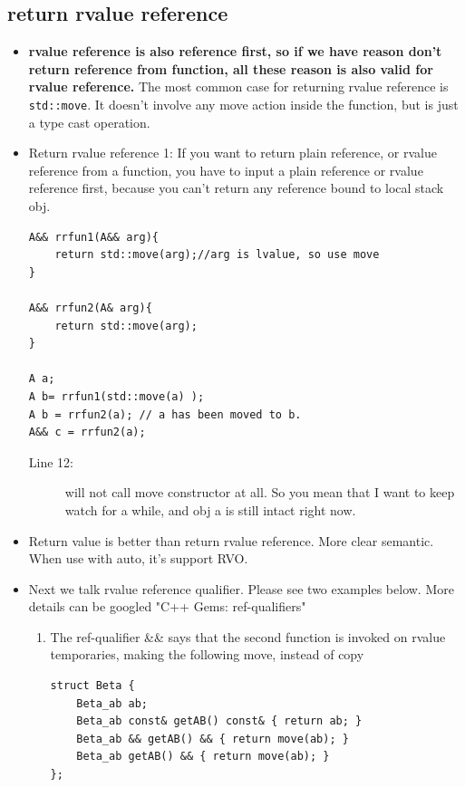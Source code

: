 \documentclass[a4paper,11pt,twoside]{book}
\begin{document}
\subsection{return rvalue reference}
\begin{itemize}
	\item \textbf{rvalue reference is also reference first, so if we have reason don't return reference from function, all these reason is also valid for rvalue reference.} The most common case for returning rvalue reference is \texttt{std::move}. It doesn't involve any move action inside the function, but is just a type cast operation.
	
	\item Return rvalue reference 1: If you want to return plain reference, or rvalue reference from a function, you have to input a plain reference or rvalue reference first, because you can't return any reference bound to local stack obj.
	
\begin{lstlisting}
A&& rrfun1(A&& arg){
	return std::move(arg);//arg is lvalue, so use move	
}
	
A&& rrfun2(A& arg){
	return std::move(arg);
}
	
A a;
A b= rrfun1(std::move(a) );
A b = rrfun2(a); // a has been moved to b. 
A&& c = rrfun2(a);
\end{lstlisting}
\begin{description}
	\item[Line 12:] will not call move constructor at all. So you mean that I want to keep watch for a while, and obj a is still intact right now.
\end{description}
 
	
	\item Return value is better than return rvalue reference.  More clear semantic. When use with auto, it's support RVO.
	
	\item Next we talk rvalue reference qualifier. Please see two examples below. More details can be googled  "C++ Gems: ref-qualifiers"
	\begin{enumerate}

		\item The ref-qualifier \&\& says that the second function is invoked on rvalue temporaries, making the following move, instead of copy
	
\begin{lstlisting}
struct Beta {
	Beta_ab ab;
	Beta_ab const& getAB() const& { return ab; }
	Beta_ab && getAB() && { return move(ab); }
	Beta_ab getAB() && { return move(ab); }
};


\end{lstlisting}
\end{enumerate}
\end{itemize}
\end{document}
